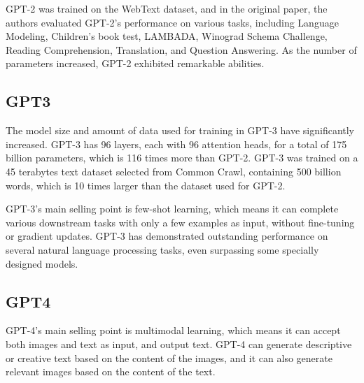 \documentclass[conference]{IEEEtran}
\begin{document}
\par GPT-2 was trained on the WebText dataset, and in the original paper, 
the authors evaluated GPT-2's performance on various tasks, including Language Modeling, 
Children's book test, LAMBADA, Winograd Schema Challenge, Reading Comprehension, 
Translation, and Question Answering. As the number of parameters increased, 
GPT-2 exhibited remarkable abilities.

\subsection{GPT3}

\par The model size and amount of data used for training in GPT-3\cite{b4} have significantly 
increased. GPT-3 has 96 layers, each with 96 attention heads, for a total of 175 billion 
parameters, which is 116 times more than GPT-2. GPT-3 was trained on a 45 terabytes 
text dataset selected from Common Crawl, containing 500 billion words, which is 
10 times larger than the dataset used for GPT-2.

\par GPT-3's main selling point is few-shot learning, which means it can complete various 
downstream tasks with only a few examples as input, without fine-tuning or gradient 
updates. GPT-3 has demonstrated outstanding performance on several natural language 
processing tasks, even surpassing some specially designed models.

\subsection{GPT4}

\par GPT-4\cite{b5}'s main selling point is multimodal learning, which means it 
can accept both images and text as input, and output text. 
GPT-4 can generate descriptive or creative text based on the content 
of the images, and it can also generate relevant images based on the content 
of the text. 


\end{document}
